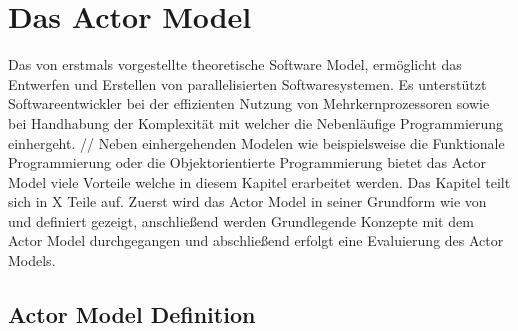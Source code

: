 \chapter{Das Actor Model}
Das von \cite{hewitt1973session} erstmals vorgestellte theoretische Software Model, ermöglicht das Entwerfen und Erstellen von parallelisierten Softwaresystemen. Es unterstützt Softwareentwickler bei der effizienten Nutzung von Mehrkernprozessoren sowie bei Handhabung der  Komplexität mit welcher die Nebenläufige Programmierung einhergeht.   //
Neben einhergehenden Modelen wie beispielsweise die Funktionale Programmierung oder die Objektorientierte Programmierung bietet das Actor Model viele Vorteile welche in diesem Kapitel erarbeitet werden.  Das Kapitel teilt sich in X Teile auf. Zuerst wird das Actor Model in seiner Grundform wie von \cite{hewitt1973session} und \cite{Agha1985ActorsSystems} definiert gezeigt, anschließend werden Grundlegende Konzepte mit dem Actor Model durchgegangen und abschließend erfolgt eine Evaluierung des Actor Models.

\section{Actor Model Definition}


